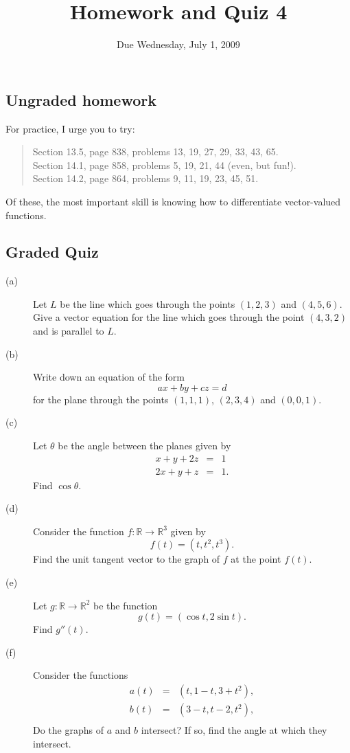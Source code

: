 \documentclass[12pt]{article}
\title{Homework and Quiz 4}
\date{Due Wednesday, July 1, 2009}
\newcommand{\R}{\mathbb{R}}
\begin{document}
\maketitle

\subsection*{Ungraded homework}

For practice, I urge you to try:
\begin{quote}
Section 13.5, page 838, problems 13, 19, 27, 29, 33, 43, 65. \\
Section 14.1, page 858, problems 5, 19, 21, 44 (even, but fun!). \\
Section 14.2, page 864, problems 9, 11, 19, 23, 45, 51.
\end{quote}
Of these, the most important skill is knowing how to differentiate
vector-valued functions.

\vfill

\subsection*{Graded Quiz}

\begin{description}
\item[(a)] Let $L$ be the line which goes through the points $(1,2,3)$
  and $(4,5,6)$.  Give a vector equation for the line which goes through the point $(4,3,2)$ and is parallel to $L$.
\vfill
\item[(b)] Write down an equation of the form
$$
a x + by + cz = d
$$
for the plane through the points $(1,1,1)$, $(2,3,4)$ and $(0,0,1)$.
\vfill
\item[(c)] Let $\theta$ be the angle between the planes given by
\begin{eqnarray*}
x+y+2z &=& 1 \\
2x + y + z &=& 1.
\end{eqnarray*}
Find $\cos \theta$.
\vfill
\item[(d)] Consider the function $f : \R \to \R^3$ given by
$$
f(t) = (t,t^2,t^3).
$$
Find the unit tangent vector to the graph of $f$ at the point $f(t)$.
\vfill
\item[(e)] Let $g : \R \to \R^2$ be the function
$$
g(t) = (\cos t, 2 \sin t).
$$
Find $g''(t)$.
\vfill
\item[(f)] Consider the functions
\begin{eqnarray*}
a(t) &=& (t,1-t,3+t^2), \\
b(t) &=& (3 - t, t-2,t^2), \\
\end{eqnarray*}
Do the graphs of $a$ and $b$ intersect?  If so, find the angle at
which they intersect.


\end{description}
\end{document}
